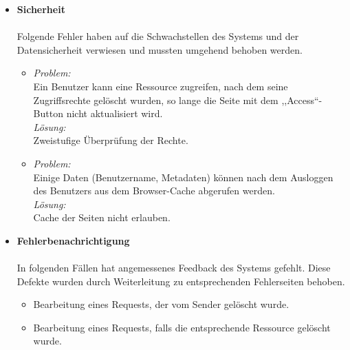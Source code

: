 \documentclass[parskip=full,11pt]{scrartcl}
\begin{document}
\begin{itemize}
\item[]\textbf{Sicherheit}\\\\
Folgende Fehler haben auf die Schwachstellen des Systems und der Datensicherheit verwiesen und mussten umgehend behoben werden.
	\begin{itemize}
		\item \textit{Problem:}\\
		Ein Benutzer kann eine Ressource zugreifen, nach dem seine Zugriffsrechte gelöscht wurden, so lange die Seite mit dem ,,Access``-Button nicht aktualisiert wird.\\
			\textit{Lösung:}\\ Zweistufige Überprüfung der Rechte.		
		\item \textit{Problem:}\\
		Einige Daten (Benutzername, Metadaten) können nach dem Ausloggen des Benutzers aus dem Browser-Cache abgerufen werden.\\
			\textit{Lösung:}\\ Cache der Seiten nicht erlauben.
	\end{itemize}

\item[] \textbf{Fehlerbenachrichtigung}\\\\
In folgenden Fällen hat angemessenes Feedback des Systems gefehlt. Diese Defekte wurden durch Weiterleitung zu entsprechenden Fehlerseiten behoben.
	\begin{itemize}
		\item Bearbeitung eines Requests, der vom Sender gelöscht wurde. 
		\item Bearbeitung eines Requests, falls die entsprechende Ressource gelöscht wurde.
	\end{itemize}
			

\end{itemize}
\end{document}
